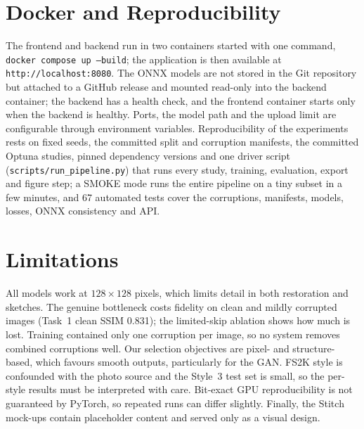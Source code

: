 \documentclass[conference]{IEEEtran}
\begin{document}
\section{Docker and Reproducibility}
The frontend and backend run in two containers started with one command, \texttt{docker compose up --build};
the application is then available at \texttt{http://localhost:8080}. The ONNX models are not stored in the
Git repository but attached to a GitHub release and mounted read-only into the backend container; the backend
has a health check, and the frontend container starts only when the backend is healthy. Ports, the model path
and the upload limit are configurable through environment variables. Reproducibility of the experiments rests
on fixed seeds, the committed split and corruption manifests, the committed Optuna studies, pinned dependency
versions and one driver script (\texttt{scripts/run\_pipeline.py}) that runs every study, training,
evaluation, export and figure step; a SMOKE mode runs the entire pipeline on a tiny subset in a few minutes,
and 67 automated tests cover the corruptions, manifests, models, losses, ONNX consistency and API.

\section{Limitations}
All models work at $128\times128$ pixels, which limits detail in both restoration and sketches. The genuine
bottleneck costs fidelity on clean and mildly corrupted images (Task~1 clean SSIM 0.831); the limited-skip
ablation shows how much is lost. Training contained only one corruption per image, so no system removes
combined corruptions well. Our selection objectives are pixel- and structure-based, which favours smooth
outputs, particularly for the GAN. FS2K style is confounded with the photo source and the Style~3 test set
is small, so the per-style results must be interpreted with care. Bit-exact GPU reproducibility is not
guaranteed by PyTorch, so repeated runs can differ slightly. Finally, the Stitch mock-ups contain
placeholder content and served only as a visual design.
\end{document}
